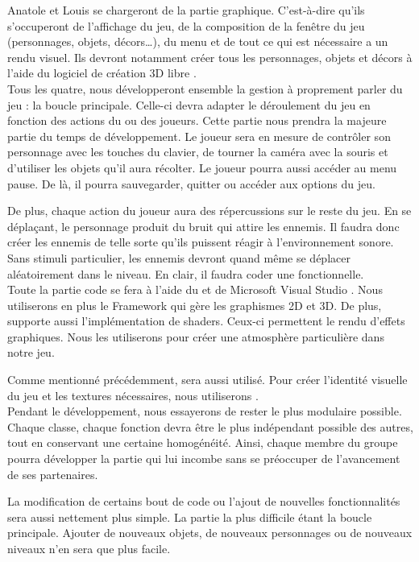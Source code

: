 \documentclass{report}
\begin{document}
Anatole et Louis se chargeront de la partie graphique. C'est-à-dire qu'ils s'occuperont de l'affichage du jeu, de la composition de la fenêtre du jeu (personnages, objets, décors\ldots), du menu et de tout ce qui est nécessaire a un rendu visuel. Ils devront  notamment créer tous les personnages, objets et décors à l'aide du logiciel de création 3D libre .\\

Tous les quatre, nous développeront ensemble la gestion à proprement parler du jeu : la boucle principale. Celle-ci devra adapter le déroulement du jeu en fonction des actions du ou des joueurs. Cette partie nous prendra la majeure partie du temps de développement. Le joueur sera en mesure de contrôler son personnage avec les touches du clavier, de tourner la caméra avec la souris et d'utiliser les objets qu'il aura récolter. Le joueur pourra aussi accéder au menu pause. De là, il pourra sauvegarder, quitter ou accéder aux options du jeu.

De plus, chaque action du joueur aura des répercussions sur le reste du jeu. En se déplaçant, le personnage produit du bruit qui attire les ennemis. Il faudra donc créer les ennemis de telle sorte qu'ils puissent réagir à l'environnement sonore. Sans stimuli particulier, les ennemis devront quand même se déplacer aléatoirement dans le niveau. En clair, il faudra coder une  fonctionnelle.\\

Toute la partie code se fera à l'aide du  et de Microsoft Visual Studio . Nous utiliserons en plus le Framework  qui gère les graphismes 2D et 3D. De plus,  supporte aussi l'implémentation de shaders. Ceux-ci permettent le rendu d'effets graphiques. Nous les utiliserons pour créer une atmosphère particulière dans notre jeu. 

Comme mentionné précédemment,  sera aussi utilisé. Pour créer l'identité visuelle du jeu et les textures nécessaires, nous utiliserons .\\

Pendant le développement, nous essayerons de rester le plus modulaire possible. Chaque classe, chaque fonction devra être le plus indépendant possible des autres, tout en conservant une certaine homogénéité. Ainsi, chaque membre du groupe pourra développer la partie qui lui incombe sans se préoccuper de l'avancement de ses partenaires. 

La modification de certains bout de code ou l'ajout de nouvelles fonctionnalités sera aussi nettement plus simple. La partie la plus difficile étant la boucle principale. Ajouter de nouveaux objets, de nouveaux personnages ou de nouveaux niveaux n'en sera que plus facile.\\
\end{document}
